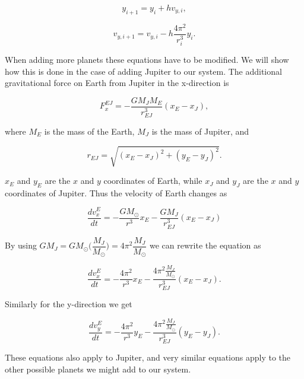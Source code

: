 \documentclass[a4paper, fontsize=11pt]{article}
\begin{document}
\begin{equation}
y_{i+1} = y_{i} + h v_{y,i},
\end{equation}

\begin{equation}
v_{y,i+1} = v_{y,i} - h \dfrac{4 \pi^2}{r_{i}^3}y_{i}.
\end{equation}

When adding more planets these equations have to be modified. We will show how this is done in the case of adding Jupiter to our system. The additional gravitational force on Earth from Jupiter in the x-direction is 

\begin{equation}
F_{x}^{EJ} = -\dfrac{G M_{J} M_{E}}{r^3_{EJ}}(x_{E} - x_{J}),
\end{equation}

where $M_{E}$ is the mass of the Earth, $M_{J}$ is the mass of Jupiter, and 

\begin{equation}
r_{EJ}=\sqrt{(x_{E}-x_{J})^2 + (y_{E}- y_{J})^2 }.
\end{equation}

$x_{E}$ and $y_{E}$ are the $x$ and $y$ coordinates of Earth, while $x_{J}$ and $y_{J}$ are the $x$ and $y$ coordinates of Jupiter. Thus the velocity of Earth changes as

\begin{equation}
\dfrac{dv_{x}^{E}}{dt}=-\dfrac{G M_{\odot}}{r^3}x_{E} - \dfrac{G M_{J}}{r_{EJ}^3}(x_{E}-x_{J})
\end{equation}

By using $G M_{J} = G M_{\odot} \Big(\dfrac{M_{J}}{M_{\odot}}\Big)=4\pi^2 \dfrac{M_{J}}{M_{\odot}}$ we can rewrite the equation as

\begin{equation}
\dfrac{dv_{x}^{E}}{dt}=-\dfrac{4\pi^2}{r^3}x_{E} - \dfrac{4\pi^2 \frac{M_{J}}{M_{\odot}} }{r_{EJ}^3}(x_{E}-x_{J}).
\end{equation}

Similarly for the y-direction we get

\begin{equation}
\dfrac{dv_{y}^{E}}{dt}=-\dfrac{4\pi^2}{r^3}y_{E} - \dfrac{4\pi^2 \frac{M_{J}}{M_{\odot}} }{r_{EJ}^3}(y_{E}-y_{J}).
\end{equation}

These equations also apply to Jupiter, and very similar equations apply to the other possible planets we might add to our system.
\end{document}
